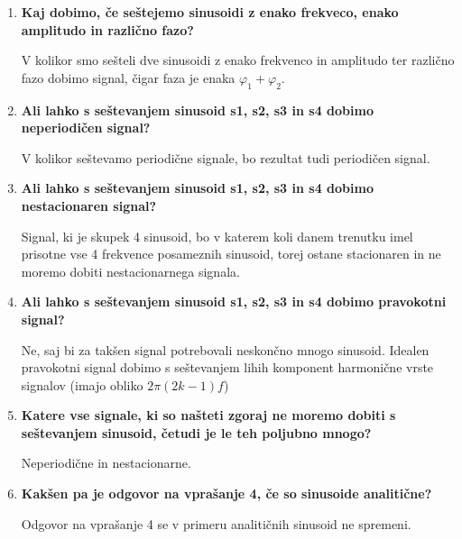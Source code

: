 \documentclass[a4paper,11pt]{article}
\begin{document}
\begin{enumerate}
	\item\textbf{Kaj dobimo, če seštejemo sinusoidi z enako frekveco, enako amplitudo in različno fazo?}

		V kolikor smo sešteli dve sinusoidi z enako frekvenco in amplitudo ter različno fazo dobimo signal, čigar faza je enaka $\varphi_1 + \varphi_2$.


 	\item \textbf{Ali lahko s seštevanjem sinusoid s1, s2, s3 in s4 dobimo neperiodičen signal?}

V kolikor seštevamo periodične signale, bo rezultat tudi periodičen signal.

 	
	\item \textbf{Ali lahko s seštevanjem sinusoid s1, s2,  s3 in s4 dobimo nestacionaren signal?}
	
Signal, ki je skupek 4 sinusoid, bo v katerem koli danem trenutku imel prisotne vse 4 frekvence posameznih sinusoid, torej ostane stacionaren in ne moremo dobiti nestacionarnega signala.	
	
	\item \textbf{Ali lahko s seštevanjem sinusoid s1, s2, s3 in s4 dobimo pravokotni signal?}

Ne, saj bi za takšen signal potrebovali neskončno mnogo sinusoid. Idealen pravokotni signal dobimo s seštevanjem lihih komponent harmonične vrste signalov (imajo obliko $2\pi (2k − 1)f$)
	
	
	\item \textbf{Katere vse signale, ki so našteti zgoraj ne moremo dobiti s seštevanjem sinusoid, četudi je le teh poljubno mnogo?}
	
Neperiodične in nestacionarne.

	\item \textbf{Kakšen pa je odgovor na vprašanje 4, če so sinusoide analitične?}

Odgovor na vprašanje 4 se v primeru analitičnih sinusoid ne spremeni.

\end{enumerate}
\end{document}

